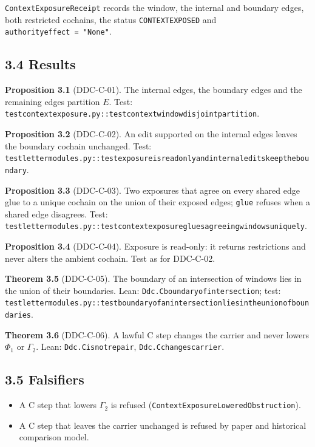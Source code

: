 \documentclass[
  11pt,
]{article}
\providecommand{\tightlist}{%
  \setlength{\itemsep}{0pt}\setlength{\parskip}{0pt}}
\renewcommand{\_}{\ddcunderscore\allowbreak}
\begin{document}
\texttt{Context\allowbreak Exposure\allowbreak Receipt} records the window, the internal and
boundary edges, both restricted cochains, the status
\texttt{CONTEXT\_EXPOSED} and \texttt{authority\_effect\ =\ "None"}.

\subsection{3.4 Results}\label{results-2}

\textbf{Proposition 3.1} (DDC-C-01). The internal edges, the boundary
edges and the remaining edges partition \(E\). Test:
\texttt{test\_context\_exposure.\allowbreak py::test\_context\_window\_disjoint\_partition}.

\textbf{Proposition 3.2} (DDC-C-02). An edit supported on the internal
edges leaves the boundary cochain unchanged. Test:
\texttt{test\_letter\_modules.\allowbreak py::test\_exposure\_is\_read\_only\_and\_internal\_edits\_keep\_the\_boundary}.

\textbf{Proposition 3.3} (DDC-C-03). Two exposures that agree on every
shared edge glue to a unique cochain on the union of their exposed
edges; \texttt{glue} refuses when a shared edge disagrees. Test:
\texttt{test\_letter\_modules.\allowbreak py::test\_context\_exposure\_glues\_agreeing\_windows\_uniquely}.

\textbf{Proposition 3.4} (DDC-C-04). Exposure is read-only: it returns
restrictions and never alters the ambient cochain. Test as for DDC-C-02.

\textbf{Theorem 3.5} (DDC-C-05). The boundary of an intersection of
windows lies in the union of their boundaries. Lean:
\texttt{Ddc.\allowbreak C\_boundary\_of\_intersection}; test:
\texttt{test\_letter\_modules.\allowbreak py::test\_boundary\_of\_an\_intersection\_lies\_in\_the\_union\_of\_boundaries}.

\textbf{Theorem 3.6} (DDC-C-06). A lawful C step changes the carrier and
never lowers \(\Phi_1\) or \(\Gamma_2\). Lean:
\texttt{Ddc.\allowbreak C\_is\_not\_repair}, \texttt{Ddc.\allowbreak C\_changes\_carrier}.

\subsection{3.5 Falsifiers}\label{falsifiers-2}

\begin{itemize}
\tightlist
\item
  A C step that lowers \(\Gamma_2\) is refused
  (\texttt{Context\allowbreak Exposure\allowbreak Lowered\allowbreak Obstruction}).
\item
  A C step that leaves the carrier unchanged is refused by paper and
  historical comparison model.
\end{itemize}
\end{document}
